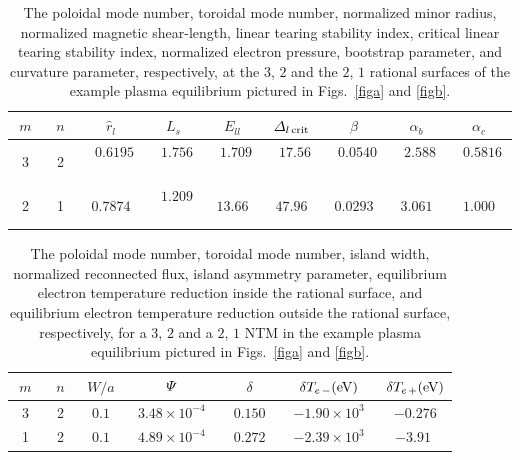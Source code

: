 \documentclass{iopjournal}
\begin{document}
\newpage
\begin{table}
\begin{tabular}{ccccccccc}
\hline
$m$ & $n$ & $\hat{r}_l$ & $L_s$ & $E_{ll}$ & ${\mit\Delta}_{l\,{\rm crit}}$ & $\hat{\beta}$ & $\alpha_b$ & $\alpha_c$\\[0.5ex]\hline
~3~&~2~ & ~$0.6195$~ & ~$1.756$~ & ~$1.709$~ & ~$17.56$~ & ~$0.0540$~ & ~$2.588$~ & ~$0.5816$~\\[0.5ex]
2& 1& $0.7874$  & ~$1.209$~&$ 13.66$ & $47.96$ & $0.0293$ & $3.061$ & $1.000$\\\hline
\end{tabular}
\caption{The poloidal mode number, toroidal mode number, normalized minor radius, normalized magnetic shear-length, linear tearing stability index, critical linear tearing stability index, normalized
electron pressure, bootstrap parameter, and curvature parameter, respectively, at the $3$, $2$ and the $2$, $1$ rational surfaces of the example
plasma equilibrium pictured in Figs.~\ref{figa} and \ref{figb}. \label{t1} }
\end{table}

\begin{table}
\begin{tabular}{ccccccc}
\hline
$m$ & $n$ & $W/a$ & ${\mit\Psi}$ & $\delta$ & ~$\delta T_{e\,-}({\rm eV})$~ & $\delta T_{e\,+}({\rm eV})$ \\[0.5ex]\hline
3& 2& $0.1$  & ~$3.48\times 10^{-4}$~&$0.150$ &  $-1.90\times 10^{3}$ & $-0.276$ \\[0.5ex]
~1~&~2~ & ~$0.1$~ & ~$4.89\times 10^{-4}$~ & ~$0.272$~ &~$-2.39\times 10^{3}$~& ~$-3.91$ ~\\\hline
\end{tabular}
\caption{The poloidal mode number, toroidal mode number, island width, normalized reconnected flux, island asymmetry parameter, equilibrium electron temperature reduction
inside the rational surface,  and equilibrium electron temperature reduction
outside the rational surface, respectively, for a $3$, $2$ and a $2$, $1$ NTM in the example
plasma equilibrium pictured in Figs.~\ref{figa} and \ref{figb}.  \label{t2} }
\end{table}
\end{document}
